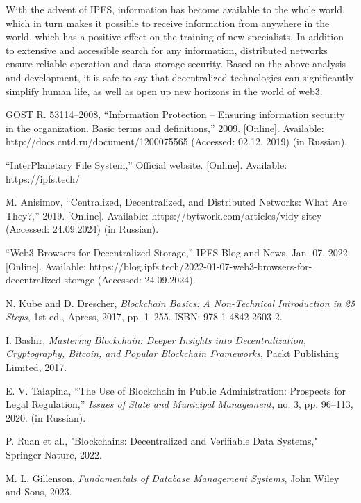 \documentclass[10pt,conference,a4paper]{IEEEtran_EDM}
\begin{document}
With the advent of IPFS, information has become available to the whole world, which in turn makes it possible to receive information from anywhere in the world, which has a positive effect on the training of new specialists.
In addition to extensive and accessible search for any information, distributed networks ensure reliable operation and data storage security.
Based on the above analysis and development, it is safe to say that decentralized technologies can significantly simplify human life, as well as open up new horizons in the world of web3.

\begin{thebibliography}{00}

 GOST R. 53114–2008, ``Information Protection – Ensuring information security in the organization. Basic terms and definitions,'' 2009. [Online]. Available: http://docs.cntd.ru/document/1200075565 (Accessed: 02.12. 2019) (in Russian).

 ``InterPlanetary File System,'' Official website. [Online]. Available: https://ipfs.tech/

 M. Anisimov, ``Centralized, Decentralized, and Distributed Networks: What Are They?,'' 2019. [Online]. Available: https://bytwork.com/articles/vidy-sitey (Accessed: 24.09.2024) (in Russian).

 ``Web3 Browsers for Decentralized Storage,'' IPFS Blog and News, Jan. 07, 2022. [Online]. Available: https://blog.ipfs.tech/2022-01-07-web3-browsers-for-decentralized-storage (Accessed: 24.09.2024).

 N. Kube and D. Drescher, \textit{Blockchain Basics: A Non-Technical Introduction in 25 Steps}, 1st ed., Apress, 2017, pp. 1–255. ISBN: 978-1-4842-2603-2.

 I. Bashir, \textit{Mastering Blockchain: Deeper Insights into Decentralization, Cryptography, Bitcoin, and Popular Blockchain Frameworks}, Packt Publishing Limited, 2017.

 E. V. Talapina, ``The Use of Blockchain in Public Administration: Prospects for Legal Regulation,'' \textit{Issues of State and Municipal Management}, no. 3, pp. 96–113, 2020. (in Russian).

 P. Ruan et al., "Blockchains: Decentralized and Verifiable Data Systems," Springer Nature, 2022.

 M. L. Gillenson, \textit{Fundamentals of Database Management Systems}, John Wiley and Sons, 2023.


\end{thebibliography}
\end{document}
